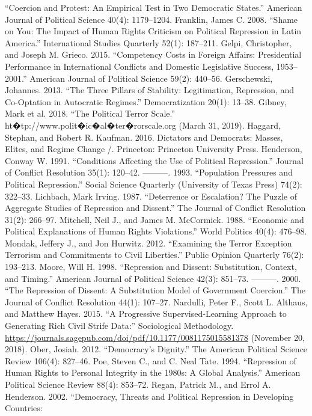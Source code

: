 \documentclass[ignorenonframetext,]{beamer}
\begin{document}
\begin{frame}[fragile]
``Coercion and Protest: An Empirical Test in Two Democratic States.''
American Journal of Political Science 40(4): 1179--1204. Franklin, James
C. 2008. ``Shame on You: The Impact of Human Rights Criticism on
Political Repression in Latin America.'' International Studies Quarterly
52(1): 187--211. Gelpi, Christopher, and Joseph M. Grieco. 2015.
``Competency Costs in Foreign Affairs: Presidential Performance in
International Conflicts and Domestic Legislative Success, 1953--2001.''
American Journal of Political Science 59(2): 440--56. Gerschewski,
Johannes. 2013. ``The Three Pillars of Stability: Legitimation,
Repression, and Co-Optation in Autocratic Regimes.'' Democratization
20(1): 13--38. Gibney, Mark et al. 2018. ``The Political Terror Scale.''
ht�tp://www.polit�ic�al�ter�rorscale.org (March 31, 2019). Haggard,
Stephan, and Robert R. Kaufman. 2016. Dictators and Democrats: Masses,
Elites, and Regime Change /. Princeton: Princeton University Press.
Henderson, Conway W. 1991. ``Conditions Affecting the Use of Political
Repression.'' Journal of Conflict Resolution 35(1): 120--42. ---------.
1993. ``Population Pressures and Political Repression.'' Social Science
Quarterly (University of Texas Press) 74(2): 322--33. Lichbach, Mark
Irving. 1987. ``Deterrence or Escalation? The Puzzle of Aggregate
Studies of Repression and Dissent.'' The Journal of Conflict Resolution
31(2): 266--97. Mitchell, Neil J., and James M. McCormick. 1988.
``Economic and Political Explanations of Human Rights Violations.''
World Politics 40(4): 476--98. Mondak, Jeffery J., and Jon Hurwitz.
2012. ``Examining the Terror Exception Terrorism and Commitments to
Civil Liberties.'' Public Opinion Quarterly 76(2): 193--213. Moore, Will
H. 1998. ``Repression and Dissent: Substitution, Context, and Timing.''
American Journal of Political Science 42(3): 851--73. ---------. 2000.
``The Repression of Dissent: A Substitution Model of Government
Coercion.'' The Journal of Conflict Resolution 44(1): 107--27. Nardulli,
Peter F., Scott L. Althaus, and Matthew Hayes. 2015. ``A Progressive
Supervised-Learning Approach to Generating Rich Civil Strife Data:''
Sociological Methodology.
\url{https://journals.sagepub.com/doi/pdf/10.1177/0081175015581378}
(November 20, 2018). Ober, Josiah. 2012. ``Democracy's Dignity.'' The
American Political Science Review 106(4): 827--46. Poe, Steven C., and
C. Neal Tate. 1994. ``Repression of Human Rights to Personal Integrity
in the 1980s: A Global Analysis.'' American Political Science Review
88(4): 853--72. Regan, Patrick M., and Errol A. Henderson. 2002.
``Democracy, Threats and Political Repression in Developing Countries:

\end{frame}
\end{document}
